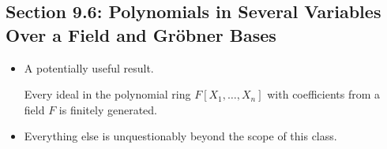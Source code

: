 \documentclass[../notes.tex]{subfiles}
\begin{document}
\subsection*{Section 9.6: Polynomials in Several Variables Over a Field and Gr\"{o}bner Bases}
\begin{itemize}
    \item A potentially useful result.
    \begin{corollary}\label{cly:9.22}
        Every ideal in the polynomial ring $F[X_1,\dots,X_n]$ with coefficients from a field $F$ is finitely generated.
    \end{corollary}
    \item Everything else is unquestionably beyond the scope of this class.
\end{itemize}
\setcounter{proposition}{0}
\end{document}

